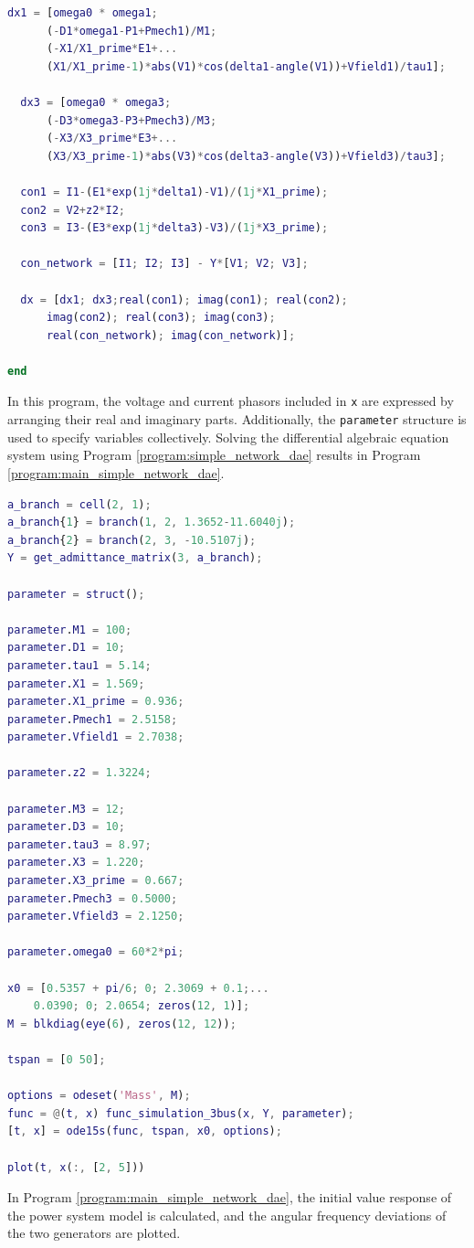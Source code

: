 \documentclass[graybox, envcountchap]{svmult}
\begin{document}
\begin{example}
\begin{lstlisting}[language=Matlab, caption=func\_simulation\_3bus.m, label={program:simple_network_dae}]
  dx1 = [omega0 * omega1;
      (-D1*omega1-P1+Pmech1)/M1;
      (-X1/X1_prime*E1+...
      (X1/X1_prime-1)*abs(V1)*cos(delta1-angle(V1))+Vfield1)/tau1];

  dx3 = [omega0 * omega3;
      (-D3*omega3-P3+Pmech3)/M3;
      (-X3/X3_prime*E3+...
      (X3/X3_prime-1)*abs(V3)*cos(delta3-angle(V3))+Vfield3)/tau3];

  con1 = I1-(E1*exp(1j*delta1)-V1)/(1j*X1_prime);
  con2 = V2+z2*I2;
  con3 = I3-(E3*exp(1j*delta3)-V3)/(1j*X3_prime);

  con_network = [I1; I2; I3] - Y*[V1; V2; V3];

  dx = [dx1; dx3;real(con1); imag(con1); real(con2);
      imag(con2); real(con3); imag(con3);
      real(con_network); imag(con_network)];

end
\end{lstlisting}

In this program, the voltage and current phasors included in \verb|x| are
expressed by arranging their real and imaginary parts. Additionally, the
\verb|parameter| structure is used to specify variables collectively. Solving
the differential algebraic equation system using Program
\ref{program:simple_network_dae} results in Program
\ref{program:main_simple_network_dae}.

\begin{lstlisting}[language=Matlab, caption=main\_simulation\_simple.m, label={program:main_simple_network_dae}]
a_branch = cell(2, 1);
a_branch{1} = branch(1, 2, 1.3652-11.6040j);
a_branch{2} = branch(2, 3, -10.5107j);
Y = get_admittance_matrix(3, a_branch);

parameter = struct();

parameter.M1 = 100;
parameter.D1 = 10;
parameter.tau1 = 5.14;
parameter.X1 = 1.569;
parameter.X1_prime = 0.936;
parameter.Pmech1 = 2.5158;
parameter.Vfield1 = 2.7038;

parameter.z2 = 1.3224;

parameter.M3 = 12;
parameter.D3 = 10;
parameter.tau3 = 8.97;
parameter.X3 = 1.220;
parameter.X3_prime = 0.667;
parameter.Pmech3 = 0.5000;
parameter.Vfield3 = 2.1250;

parameter.omega0 = 60*2*pi;

x0 = [0.5357 + pi/6; 0; 2.3069 + 0.1;...
    0.0390; 0; 2.0654; zeros(12, 1)];
M = blkdiag(eye(6), zeros(12, 12));

tspan = [0 50];

options = odeset('Mass', M);
func = @(t, x) func_simulation_3bus(x, Y, parameter);
[t, x] = ode15s(func, tspan, x0, options); 

plot(t, x(:, [2, 5]))
\end{lstlisting}

In Program \ref{program:main_simple_network_dae}, the initial value response of
the power system model is calculated, and the angular frequency deviations of
the two generators are plotted.
\end{example}
\end{document}

